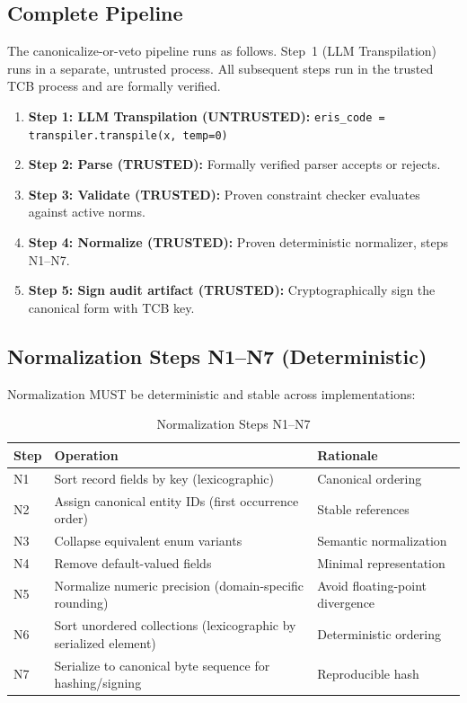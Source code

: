 \documentclass[11pt,letterpaper]{article}
\theoremstyle{definition}
\theoremstyle{remark}
\begin{document}
\subsection{Complete Pipeline}

The canonicalize-or-veto pipeline runs as follows. Step~1 (LLM Transpilation) runs in a separate, untrusted process. All subsequent steps run in the trusted TCB process and are formally verified.

\begin{enumerate}
\item \textbf{Step 1: LLM Transpilation (UNTRUSTED):} \texttt{eris\_code = transpiler.transpile(x, temp=0)}
\item \textbf{Step 2: Parse (TRUSTED):} Formally verified parser accepts or rejects.
\item \textbf{Step 3: Validate (TRUSTED):} Proven constraint checker evaluates against active norms.
\item \textbf{Step 4: Normalize (TRUSTED):} Proven deterministic normalizer, steps N1--N7.
\item \textbf{Step 5: Sign audit artifact (TRUSTED):} Cryptographically sign the canonical form with TCB key.
\end{enumerate}

\subsection{Normalization Steps N1--N7 (Deterministic)}

Normalization MUST be deterministic and stable across implementations:

\begin{table}[h]
\centering
\begin{tabular}{@{}lll@{}}
\toprule
\textbf{Step} & \textbf{Operation} & \textbf{Rationale} \\
\midrule
N1 & Sort record fields by key (lexicographic) & Canonical ordering \\
N2 & Assign canonical entity IDs (first occurrence order) & Stable references \\
N3 & Collapse equivalent enum variants & Semantic normalization \\
N4 & Remove default-valued fields & Minimal representation \\
N5 & Normalize numeric precision (domain-specific rounding) & Avoid floating-point divergence \\
N6 & Sort unordered collections (lexicographic by serialized element) & Deterministic ordering \\
N7 & Serialize to canonical byte sequence for hashing/signing & Reproducible hash \\
\bottomrule
\end{tabular}
\caption{Normalization Steps N1--N7}
\end{table}
\end{document}
